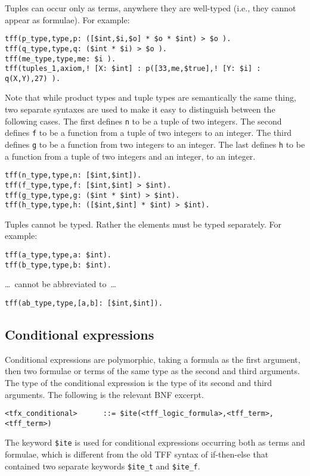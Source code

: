 \documentclass{easychair}
\begin{document}
Tuples can occur only as terms, anywhere they are well-typed (i.e., they
cannot appear as formulae). 
For example:
\begin{verbatim}
tff(p_type,type,p: ([$int,$i,$o] * $o * $int) > $o ).
tff(q_type,type,q: ($int * $i) > $o ).
tff(me_type,type,me: $i ).
tff(tuples_1,axiom,! [X: $int] : p([33,me,$true],! [Y: $i] : q(X,Y),27) ).
\end{verbatim}
Note that while product types and tuple types are semantically the same
thing, two separate syntaxes are used to make it easy to distinguish 
between the following cases.
The first defines \verb|n| to be a tuple of two integers.
The second defines \verb|f| to be a function from a tuple of two integers
to an integer.
The third defines \verb|g| to be a function from two integers to an integer.
The last defines \verb|h| to be a function from a tuple of two integers and
an integer, to an integer.
\begin{verbatim}
tff(n_type,type,n: [$int,$int]).
tff(f_type,type,f: [$int,$int] > $int).
tff(g_type,type,g: ($int * $int) > $int).
tff(h_type,type,h: ([$int,$int] * $int) > $int).
\end{verbatim}

Tuples cannot be typed. Rather the elements must be typed separately. 
For example:
\begin{verbatim}
tff(a_type,type,a: $int).
tff(b_type,type,b: $int).
\end{verbatim}
\ldots~cannot be abbreviated to~\ldots
\begin{verbatim}
tff(ab_type,type,[a,b]: [$int,$int]).
\end{verbatim}

\subsection{Conditional expressions}

Conditional expressions are polymorphic, taking a formula as the first 
argument, then two formulae or terms of the same type as the second and 
third arguments. 
The type of the conditional expression is the type of its second and third 
arguments. 
The following is the relevant BNF excerpt.
\begin{verbatim}
<tfx_conditional>      ::= $ite(<tff_logic_formula>,<tff_term>,<tff_term>)
\end{verbatim}
The keyword \verb'$ite' is used for conditional expressions occurring both as
terms and formulae, which is different from the old TFF syntax of if-then-else
that contained two separate keywords \verb'$ite_t' and \verb'$ite_f'.
\end{document}
